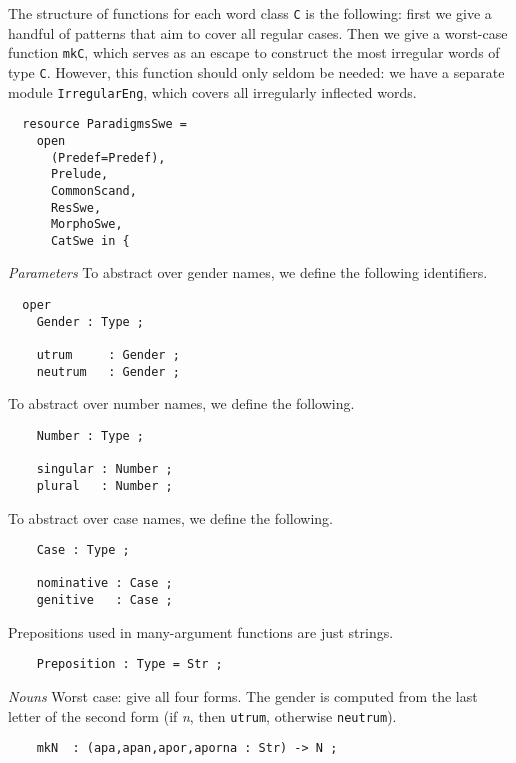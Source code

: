 \documentclass[11pt,a4paper]{article}
\newcommand{\subsubsubsection}[1]{\textit{#1}}
\begin{document}
The structure of functions for each word class \texttt{C} is the following:
first we give a handful of patterns that aim to cover all
regular cases. Then we give a worst-case function \texttt{mkC}, which serves as an
escape to construct the most irregular words of type \texttt{C}.
However, this function should only seldom be needed: we have a
separate module \texttt{IrregularEng}, which covers all irregularly inflected
words.

\begin{verbatim}
  resource ParadigmsSwe = 
    open 
      (Predef=Predef), 
      Prelude, 
      CommonScand, 
      ResSwe, 
      MorphoSwe, 
      CatSwe in {
\end{verbatim}

\subsubsubsection{Parameters}
To abstract over gender names, we define the following identifiers.

\begin{verbatim}
  oper
    Gender : Type ; 
  
    utrum     : Gender ;
    neutrum   : Gender ;
\end{verbatim}

To abstract over number names, we define the following.

\begin{verbatim}
    Number : Type ; 
  
    singular : Number ;
    plural   : Number ;
\end{verbatim}

To abstract over case names, we define the following.

\begin{verbatim}
    Case : Type ;
  
    nominative : Case ;
    genitive   : Case ;
\end{verbatim}

Prepositions used in many-argument functions are just strings.

\begin{verbatim}
    Preposition : Type = Str ;
\end{verbatim}

\subsubsubsection{Nouns}
Worst case: give all four forms. The gender is computed from the
last letter of the second form (if \textit{n}, then \texttt{utrum}, otherwise \texttt{neutrum}).

\begin{verbatim}
    mkN  : (apa,apan,apor,aporna : Str) -> N ;
\end{verbatim}
\end{document}
